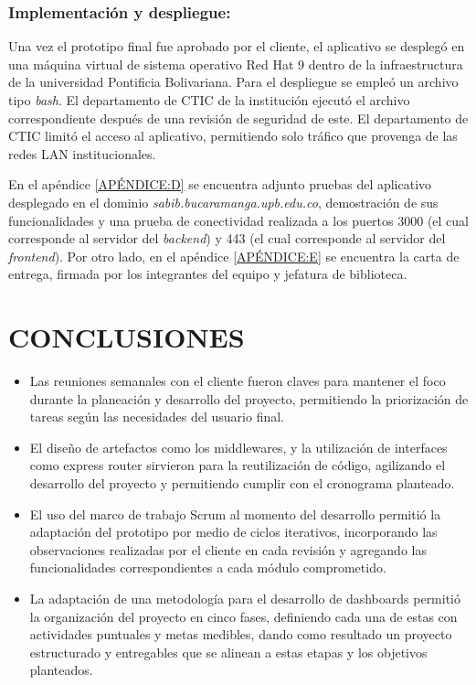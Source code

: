 \documentclass[spanish]{ieee_upb}
\begin{document}
\subsubsection[Implementación]{Implementación y despliegue: }

Una vez el prototipo final fue aprobado por el cliente, el aplicativo se desplegó en una máquina virtual de sistema operativo Red Hat 9 dentro de la infraestructura de la universidad Pontificia Bolivariana.
Para el despliegue se empleó un archivo tipo \textit{bash}. El departamento de CTIC de la institución ejecutó el archivo correspondiente después de una revisión
de seguridad de este. El departamento de CTIC limitó el acceso al aplicativo, permitiendo solo tráfico que provenga de las redes LAN institucionales. 

\vspace{0.3cm}
En el apéndice \ref{APÉNDICE:D} se encuentra adjunto pruebas del aplicativo desplegado en el dominio \textit{sabib.bucaramanga.upb.edu.co}, demostración de sus funcionalidades y una prueba de conectividad realizada a los puertos 3000 (el cual corresponde al 
servidor del \textit{backend}) y 443 (el cual corresponde al servidor del \textit{frontend}). Por otro lado,
en el apéndice \ref{APÉNDICE:E} se encuentra la carta de entrega, firmada por los 
integrantes del equipo y jefatura de biblioteca.



\newpage
\section{CONCLUSIONES}
\begin{itemize}
  \item Las reuniones semanales con el cliente fueron claves para mantener el foco durante la planeación y desarrollo del proyecto, permitiendo la priorización de tareas según las necesidades del usuario final.
  \item El diseño de artefactos como los middlewares, y la utilización de interfaces como express router sirvieron para la reutilización de código, agilizando el desarrollo del proyecto y permitiendo cumplir con el cronograma planteado.
  \item El uso del marco de trabajo Scrum al momento del desarrollo permitió la adaptación del prototipo por medio de ciclos iterativos, incorporando las observaciones realizadas por el cliente en cada revisión y agregando las funcionalidades correspondientes a cada módulo comprometido. 
  \item La adaptación de una metodología para el desarrollo de dashboards  permitió la organización del proyecto en cinco fases, definiendo cada una de estas con actividades puntuales y metas medibles, dando como resultado un proyecto estructurado y entregables que se alinean a estas etapas y los objetivos planteados.


\end{itemize}
\newpage
\end{document}

